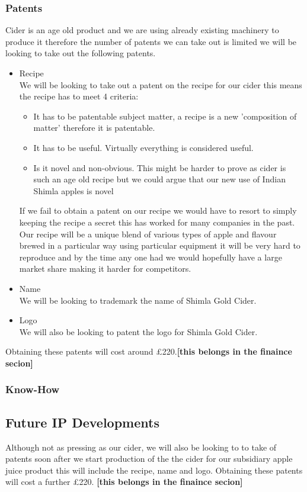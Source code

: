 \documentclass[11pt]{article}
\begin{document}
    \subsubsection{Patents}
    Cider is an age old product and we are using already existing machinery to
    produce it therefore the number of patents we can take out is limited we will
    be looking to take out the following patents.
    \begin{itemize}
    	\item Recipe \\
We will be looking to take out a patent on the recipe for our cider this means the recipe has to meet 4 criteria:
 	      \begin{itemize}
		  \item It has to be patentable subject matter, a recipe is a new 'composition of matter' therefore it is patentable.
		  \item It has to be useful. Virtually everything is considered useful.
		  \item Is it novel and non-obvious. This might be harder to prove as cider is such an age old recipe but we could argue that our new use of Indian Shimla apples is novel
	      \end{itemize}
If we fail to obtain a patent on our recipe we would have to resort to simply keeping the recipe a secret this has worked for many companies in the past. Our recipe will be a unique blend of various types of apple and flavour brewed in a particular way using particular equipment it will be very hard to reproduce and by the time any one had we would hopefully have a large market share making it harder for competitors.
	\item Name \\
    We will be looking to trademark the name of Shimla Gold Cider.
	\item Logo \\
    We will also be looking to patent the logo for Shimla Gold Cider.
    \end{itemize}
Obtaining these patents will cost around £220.\textbf{[this belongs in the finaince secion]}

    \subsubsection{Know-How}

  \subsection{Future IP Developments}
Although not as pressing as our cider, we will also be looking to to take of patents soon after we start production of the the cider for our subsidiary apple juice product this will include the recipe, name and logo. Obtaining these patents will cost a further £220. \textbf{[this belongs in the finaince secion]}
\end{document}
